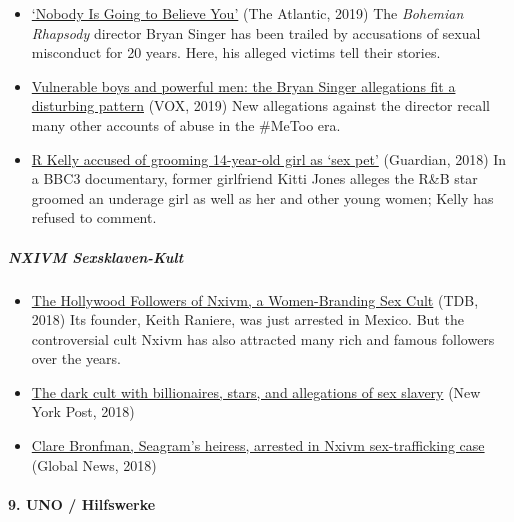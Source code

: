 \begin{itemize}
\item
  \href{https://www.theatlantic.com/magazine/archive/2019/03/bryan-singers-accusers-speak-out/580462/}{`Nobody
  Is Going to Believe You'} (The Atlantic, 2019) The \emph{Bohemian
  Rhapsody} director Bryan Singer has been trailed by accusations of
  sexual misconduct for 20 years. Here, his alleged victims tell their
  stories.
\item
  \href{https://www.vox.com/identities/2019/1/23/18194475/bryan-singer-victor-valdovinos-the-atlantic-skopek}{Vulnerable
  boys and powerful men: the Bryan Singer allegations fit a disturbing
  pattern} (VOX, 2019) New allegations against the director recall many
  other accounts of abuse in the \#MeToo era.
\item
  \href{https://www.theguardian.com/music/2018/mar/28/r-kelly-accused-of-grooming-14-year-old-girl-as-sex-pet-kitti-jones-bbc-documentary}{R
  Kelly accused of grooming 14-year-old girl as `sex pet'} (Guardian,
  2018) In a BBC3 documentary, former girlfriend Kitti Jones alleges the
  R\&B star groomed an underage girl as well as her and other young
  women; Kelly has refused to comment.
\end{itemize}

\hypertarget{nxivm-sexsklaven-kult}{%
\subparagraph{\texorpdfstring{\textbf{NXIVM
Sexsklaven-Kult}}{NXIVM Sexsklaven-Kult}}\label{nxivm-sexsklaven-kult}}

\begin{itemize}
\tightlist
\item
  \href{https://www.thedailybeast.com/the-hollywood-followers-of-nxivm-a-women-branding-sex-cult}{The
  Hollywood Followers of Nxivm, a Women-Branding Sex Cult} (TDB, 2018)
  Its founder, Keith Raniere, was just arrested in Mexico. But the
  controversial cult Nxivm has also attracted many rich and famous
  followers over the years.
\item
  \href{https://nypost.com/2018/03/27/inside-the-cult-authorities-allege-was-a-secret-society-of-sex-slaves/}{The
  dark cult with billionaires, stars, and allegations of sex slavery}
  (New York Post, 2018)
\item
  \href{https://globalnews.ca/news/4350140/clare-bronfman-seagrams-arrested-nxivm-sex-cult/}{Clare
  Bronfman, Seagram's heiress, arrested in Nxivm sex-trafficking case}
  (Global News, 2018)
\end{itemize}

\hypertarget{9-uno--hilfswerke}{%
\paragraph{9. UNO / Hilfswerke}\label{9-uno--hilfswerke}}

